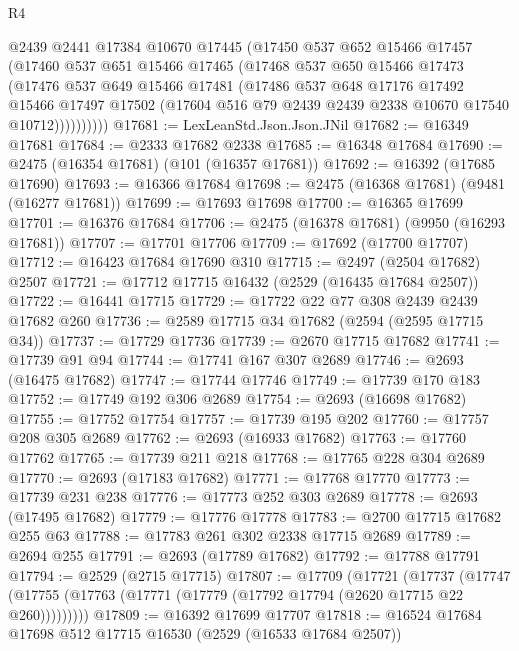 \begin{lexlean}{R4}
\begin{coremodule}
            @2439
            @2441
            @17384
            @10670
            @17445
            (@17450
              @537
              @652
              @15466
              @17457
              (@17460
                @537
                @651
                @15466
                @17465
                (@17468
                  @537
                  @650
                  @15466
                  @17473
                  (@17476
                    @537
                    @649
                    @15466
                    @17481
                    (@17486
                      @537
                      @648
                      @17176
                      @17492
                      @15466
                      @17497
                      @17502
                      (@17604 @516 @79 @2439 @2439 @2338 @10670 @17540 @10712))))))))))
@17681 := LexLeanStd.Json.Json.JNil
@17682 := @16349 @17681
@17684 := @2333 @17682 @2338
@17685 := @16348 @17684
@17690 := @2475 (@16354 @17681) (@101 (@16357 @17681))
@17692 := @16392 (@17685 @17690)
@17693 := @16366 @17684
@17698 := @2475 (@16368 @17681) (@9481 (@16277 @17681))
@17699 := @17693 @17698
@17700 := @16365 @17699
@17701 := @16376 @17684
@17706 := @2475 (@16378 @17681) (@9950 (@16293 @17681))
@17707 := @17701 @17706
@17709 := @17692 (@17700 @17707)
@17712 := @16423 @17684 @17690 @310
@17715 := @2497 (@2504 @17682) @2507
@17721 := @17712 @17715 @16432 (@2529 (@16435 @17684 @2507))
@17722 := @16441 @17715
@17729 := @17722 @22 @77 @308 @2439 @2439 @17682 @260
@17736 := @2589 @17715 @34 @17682 (@2594 (@2595 @17715 @34))
@17737 := @17729 @17736
@17739 := @2670 @17715 @17682
@17741 := @17739 @91 @94
@17744 := @17741 @167 @307 @2689
@17746 := @2693 (@16475 @17682)
@17747 := @17744 @17746
@17749 := @17739 @170 @183
@17752 := @17749 @192 @306 @2689
@17754 := @2693 (@16698 @17682)
@17755 := @17752 @17754
@17757 := @17739 @195 @202
@17760 := @17757 @208 @305 @2689
@17762 := @2693 (@16933 @17682)
@17763 := @17760 @17762
@17765 := @17739 @211 @218
@17768 := @17765 @228 @304 @2689
@17770 := @2693 (@17183 @17682)
@17771 := @17768 @17770
@17773 := @17739 @231 @238
@17776 := @17773 @252 @303 @2689
@17778 := @2693 (@17495 @17682)
@17779 := @17776 @17778
@17783 := @2700 @17715 @17682 @255 @63
@17788 := @17783 @261 @302 @2338 @17715 @2689
@17789 := @2694 @255
@17791 := @2693 (@17789 @17682)
@17792 := @17788 @17791
@17794 := @2529 (@2715 @17715)
@17807 := @17709
    (@17721
      (@17737 (@17747 (@17755 (@17763 (@17771 (@17779 (@17792 @17794 (@2620 @17715 @22 @260)))))))))
@17809 := @16392 @17699 @17707
@17818 := @16524 @17684 @17698 @512 @17715 @16530 (@2529 (@16533 @17684 @2507))

\end{coremodule}
\end{lexlean}
